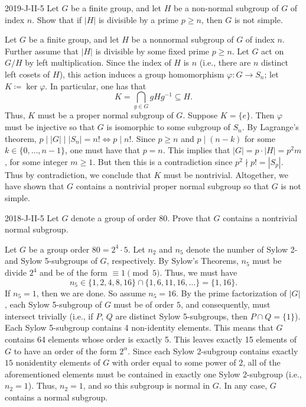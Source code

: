 \documentclass{article}
\begin{document}
	\begin{prb}{2019-J-II-5}
		Let $G$ be a finite group, and let $H$ be a non-normal subgroup of $G$ of index $n$. Show that if $|H|$ is divisible by a prime $p \geq n$, then $G$ is not simple. 
	\end{prb}
	Let $G$ be a finite group, and let $H$ be a nonnormal subgroup of $G$ of index $n$. Further assume that $|H|$ is divisible by some fixed prime $p \geq n$. Let $G$ act on $G/H$ by left multiplication. Since the index of $H$ is $n$ (i.e., there are $n$ distinct left cosets of $H$), this action induces a group homomorphism $\varphi: G \to S_{n}$; let $K \coloneqq \ker{\varphi}$. In particular, one has that 
	\begin{equation*}
		K = \bigcap_{g \in G}gHg^{-1} \subseteq H. 
	\end{equation*}
	Thus, $K$ must be a proper normal subgroup of $G$. Suppose $K = \{e\}$. Then $\varphi$ must be injective so that $G$ is isomorphic to some subgroup of $S_{n}$. By Lagrange's theorem, $p \mid |G| \mid |S_{n}| = n! \iff p \mid n!$. Since $p \geq n$ and $p \mid (n - k)$ for some $k \in \{0, \ldots, n - 1\}$, one must have that $p = n$. This implies that $|G| = p \cdot |H| = p^{2}m$, for some integer $m \geq 1$. But then this is a contradiction since $p^2 \nmid p! = |S_{p}|$. Thus by contradiction, we conclude that $K$ must be nontrivial. Altogether, we have shown that $G$ contains a nontrivial proper normal subgroup so that $G$ is not simple. 
	
	
	
	\begin{prb}{2018-J-II-5}
		Let $G$ denote a group of order 80. Prove that $G$ contains a nontrivial normal subgroup. 
	\end{prb}
	Let $G$ be a group order $80 = 2^{4} \cdot 5$. Let $n_{2}$ and $n_{5}$ denote the number of Sylow 2- and Sylow 5-subgroups of $G$, respectively. By Sylow's Theorems, $n_{5}$ must be divide $2^{4}$ and be of the form $\equiv 1 \pmod{5}$. Thus, we must have 
	\begin{equation*}
		n_{5} \in \{1, 2, 4, 8, 16\} \cap \{1, 6, 11, 16, \ldots\} = \{1, 16\}. 
	\end{equation*}
	If $n_{5} = 1$, then we are done. So assume $n_{5} = 16$. By the prime factorization of $|G|$, each Sylow 5-subgroup of $G$ must be of order $5$, and consequently, must intersect trivially (i.e., if $P$, $Q$ are distinct Sylow 5-subgroups, then $P \cap Q = \{1\}$). Each Sylow 5-subgroup contains 4 non-identity elements. This means that $G$ contains 64 elements whose order is exactly 5. This leaves exactly 15 elements of $G$ to have an order of the form $2^{\alpha}$. Since each Sylow 2-subgroup contains exactly $15$ nonidentity elements of $G$ with order equal to some power of $2$, all of the aforementioned elements must be contained in exactly one Sylow 2-subgroup (i.e., $n_{2} = 1$). Thus, $n_{2} = 1$, and so this subgroup is normal in $G$. In any case, $G$ contains a normal subgroup.
	
\end{document}
